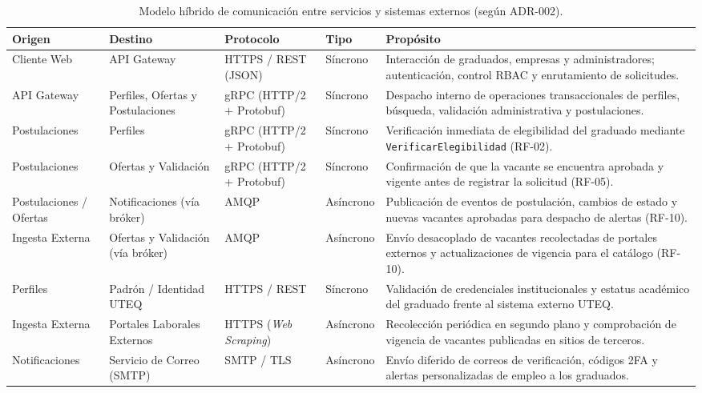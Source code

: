 \documentclass[11pt,a4paper]{article}
\begin{document}
\begin{table}[htbp]
\centering
\caption{Modelo híbrido de comunicación entre servicios y sistemas externos (según ADR-002).}
\label{tab:comunicacion}
\small
\begin{tabularx}{\textwidth}{>{\raggedright\arraybackslash}p{2.6cm} >{\raggedright\arraybackslash}p{2.7cm} >{\raggedright\arraybackslash}p{2.3cm} l X}
\toprule
\textbf{Origen} & \textbf{Destino} & \textbf{Protocolo} & \textbf{Tipo} & \textbf{Propósito} \\
\midrule
Cliente Web & API Gateway & HTTPS / REST (JSON) & Síncrono & Interacción de graduados, empresas y administradores; autenticación, control RBAC y enrutamiento de solicitudes. \\
API Gateway & Perfiles, Ofertas y Postulaciones & gRPC (HTTP/2 + Protobuf) & Síncrono & Despacho interno de operaciones transaccionales de perfiles, búsqueda, validación administrativa y postulaciones. \\
Postulaciones & Perfiles & gRPC (HTTP/2 + Protobuf) & Síncrono & Verificación inmediata de elegibilidad del graduado mediante \texttt{VerificarElegibilidad} (RF-02). \\
Postulaciones & Ofertas y Validación & gRPC (HTTP/2 + Protobuf) & Síncrono & Confirmación de que la vacante se encuentra aprobada y vigente antes de registrar la solicitud (RF-05). \\
Postulaciones / Ofertas & Notificaciones (vía bróker) & AMQP & Asíncrono & Publicación de eventos de postulación, cambios de estado y nuevas vacantes aprobadas para despacho de alertas (RF-10). \\
Ingesta Externa & Ofertas y Validación (vía bróker) & AMQP & Asíncrono & Envío desacoplado de vacantes recolectadas de portales externos y actualizaciones de vigencia para el catálogo (RF-10). \\
Perfiles & Padrón / Identidad UTEQ & HTTPS / REST & Síncrono & Validación de credenciales institucionales y estatus académico del graduado frente al sistema externo UTEQ. \\
Ingesta Externa & Portales Laborales Externos & HTTPS (\textit{Web Scraping}) & Asíncrono & Recolección periódica en segundo plano y comprobación de vigencia de vacantes publicadas en sitios de terceros. \\
Notificaciones & Servicio de Correo (SMTP) & SMTP / TLS & Asíncrono & Envío diferido de correos de verificación, códigos 2FA y alertas personalizadas de empleo a los graduados. \\
\bottomrule
\end{tabularx}
\end{table}
\end{document}
